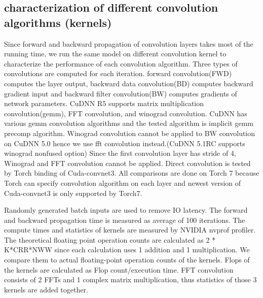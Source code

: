 \documentclass[conference]{IEEEtran}
\begin{document}
\subsection{characterization of different convolution algorithms (kernels)}
Since forward and backward propagation of convolution layers takes most of the running time, we run the same model on different convolution kernel to characterize the performance of each convolution algorithm.
Three types of convolutions are computed for each iteration.
forward convolution(FWD) computes the layer output, backward data convolution(BD) computes backward gradient input and backward filter convolution(BW) computes gradients of network parameters.
CuDNN R5 supports matrix multiplication convolution(gemm), FFT convolution, and winograd convolution.
CuDNN has various gemm convolution algorithms and the tested algorithm is implicit gemm precomp algorithm.
Winograd convolution cannot be applied to BW convolution on CuDNN 5.0 hence we use fft convolution instead.(CuDNN 5.1RC supports winograd nonfused option)
Since the first convolution layer has stride of 4, Winograd and FFT convolution cannot be applied.
Direct convolution is tested by Torch binding of Cuda-convnet3.
All comparisons are done on Torch 7 because Torch can specify convolution algorithm on each layer and newest version of Cuda-convnet3 is only supported by Torch7.

Randomly generated batch inputs are used to remove IO latency.
The forward and backward propagation time is measured as average of 100 iterations.
The compute times and statistics of kernels are measured by NVIDIA nvprof profiler.
The theoretical floating point operation counts are calculated as 2 * K*CRR*NWW since each calculation uses 1 addition and 1 multiplication.
We compare them to actual floating-point operation counts of the kernels.
Flops of the kernels are calculated as Flop count/execution time.
FFT convolution consists of 2 FFTs and 1 complex matrix multiplication, thus statistics of those 3 kernels are added together.
\end{document}
